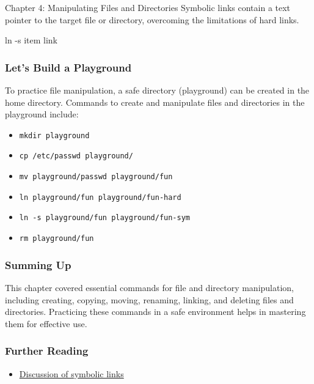 \begin{notes}{Chapter 4: Manipulating Files and Directories}
    Symbolic links contain a text pointer to the target file or directory, overcoming the limitations of hard links.

    \begin{highlight}
    \begin{code}[Pseudo]
    ln -s item link
    \end{code}
    \end{highlight}

    \subsubsection*{Let's Build a Playground}

    To practice file manipulation, a safe directory (playground) can be created in the home directory. Commands to create and manipulate files and directories in the playground include:
    \begin{itemize}
        \item \texttt{mkdir playground}
        \item \texttt{cp /etc/passwd playground/}
        \item \texttt{mv playground/passwd playground/fun}
        \item \texttt{ln playground/fun playground/fun-hard}
        \item \texttt{ln -s playground/fun playground/fun-sym}
        \item \texttt{rm playground/fun}
    \end{itemize}

    \subsubsection*{Summing Up}

    This chapter covered essential commands for file and directory manipulation, including creating, copying, moving, renaming, linking, and deleting files and directories. Practicing these commands 
    in a safe environment helps in mastering them for effective use.

    \subsubsection*{Further Reading}

    \begin{itemize}
        \item \href{http://en.wikipedia.org/wiki/Symbolic_link}{Discussion of symbolic links}
    \end{itemize}
\end{notes}


